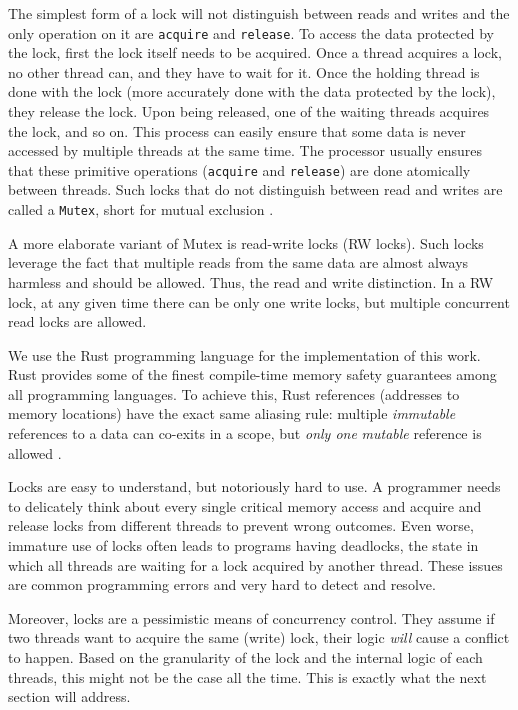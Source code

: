 The simplest form of a lock will not distinguish between reads and writes and the only operation on
it are \texttt{acquire} and \texttt{release}. To access the data protected by the lock, first the
lock itself needs to be acquired. Once a thread acquires a lock, no other thread can, and they have
to wait for it. Once the holding thread is done with the lock (more accurately done with the data
protected by the lock), they release the lock. Upon being released, one of the waiting threads
acquires the lock, and so on. This process can easily ensure that some data is never accessed by
multiple threads at the same time. The processor usually ensures that these primitive operations
(\texttt{acquire} and \texttt{release}) are done atomically between threads. Such locks that do not
distinguish between read and writes are called a \texttt{Mutex}, short for mutual exclusion
\cite{guerraouiLockUnlockThat2019}.

A more elaborate variant of Mutex is read-write locks (RW locks). Such locks leverage the
fact that multiple reads from the same data are almost always harmless and should be allowed. Thus,
the read and write distinction. In a RW lock, at any given time there can be only one write
locks, but multiple concurrent read locks are allowed.

\begin{remark}
	We use the Rust programming language for the implementation of this work. Rust provides some of
	the finest compile-time memory safety guarantees among all programming languages. To achieve
	this, Rust references (addresses to memory locations) have the exact same aliasing rule:
	multiple \textit{immutable} references to a data can co-exits in a scope, but \textit{only one}
	\textit{mutable} reference is allowed \cite{weissOxideEssenceRust2020}.
\end{remark}

Locks are easy to understand, but notoriously hard to use. A programmer needs to delicately think
about every single critical memory access and acquire and release locks from different threads to
prevent wrong outcomes. Even worse, immature use of locks often leads to programs having deadlocks,
the state in which all threads are waiting for a lock acquired by another thread. These issues are
common programming errors and very hard to detect and resolve.


Moreover, locks are a pessimistic means of concurrency control. They assume if two threads want
to acquire the same (write) lock, their logic \textit{will} cause a conflict to happen. Based on the
granularity of the lock and the internal logic of each threads, this might not be the case all the
time. This is exactly what the next section will address.

